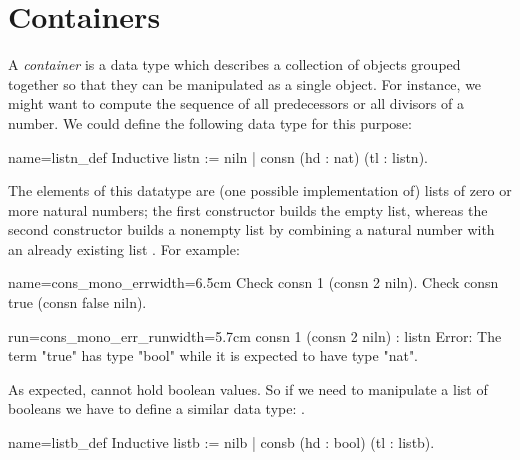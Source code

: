 

\section{Containers}\label{sec:poly}


A \emph{container} is a data type which describes a collection of
objects grouped together so that they can be manipulated as a single
object. For instance, we might want to compute the sequence of all
predecessors or all divisors of a number.  We could define the
following data type for this purpose:

\begin{coq}{name=listn_def}{}
Inductive listn := niln | consn (hd : nat) (tl : listn).
\end{coq}

The elements of this datatype are (one possible implementation of)
lists of zero or more natural numbers; the first constructor
 builds the empty list, whereas the second constructor
 builds a nonempty list by combining a natural number 
with an already existing list .
For example:

\begin{coq}{name=cons_mono_err}{width=6.5cm}
Check consn 1 (consn 2 niln).
Check consn true (consn false niln).
$~$
$~$
\end{coq}{}{}
\begin{coqout}{run=cons_mono_err_run}{width=5.7cm}
consn 1 (consn 2 niln) : listn
Error: The term "true" has
type "bool" while it is
expected to have type "nat".
\end{coqout}{}{}

As expected,  %
cannot hold boolean values.
So if we need to
manipulate a list of booleans we have to define a similar data type:
.

\begin{coq}{name=listb_def}{}
Inductive listb := nilb | consb (hd : bool) (tl : listb).
\end{coq}

